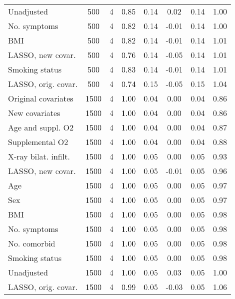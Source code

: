 \documentclass{article}
\begin{document}
\begin{table}[htbp]
{\begin{tabular}{lccccccc}
Unadjusted & 500 & 4 & 0.85 & 0.14 & 0.02 & 0.14 & 1.00\\
No. symptoms & 500 & 4 & 0.82 & 0.14 & -0.01 & 0.14 & 1.00\\
BMI & 500 & 4 & 0.82 & 0.14 & -0.01 & 0.14 & 1.01\\
LASSO, new covar. & 500 & 4 & 0.76 & 0.14 & -0.05 & 0.14 & 1.01\\
Smoking status & 500 & 4 & 0.83 & 0.14 & -0.01 & 0.14 & 1.01\\
LASSO, orig. covar. & 500 & 4 & 0.74 & 0.15 & -0.05 & 0.15 & 1.04\\ \midrule
Original covariates & 1500 & 4 & 1.00 & 0.04 & 0.00 & 0.04 & 0.86\\
New covariates & 1500 & 4 & 1.00 & 0.04 & 0.00 & 0.04 & 0.86\\
Age and suppl. O2 & 1500 & 4 & 1.00 & 0.04 & 0.00 & 0.04 & 0.87\\
Supplemental O2 & 1500 & 4 & 1.00 & 0.04 & 0.00 & 0.04 & 0.88\\
X-ray bilat. infilt. & 1500 & 4 & 1.00 & 0.05 & 0.00 & 0.05 & 0.93\\
LASSO, new covar. & 1500 & 4 & 1.00 & 0.05 & -0.01 & 0.05 & 0.96\\
Age & 1500 & 4 & 1.00 & 0.05 & 0.00 & 0.05 & 0.97\\
Sex & 1500 & 4 & 1.00 & 0.05 & 0.00 & 0.05 & 0.97\\
BMI & 1500 & 4 & 1.00 & 0.05 & 0.00 & 0.05 & 0.98\\
No. symptoms & 1500 & 4 & 1.00 & 0.05 & 0.00 & 0.05 & 0.98\\
No. comorbid & 1500 & 4 & 1.00 & 0.05 & 0.00 & 0.05 & 0.98\\
Smoking status & 1500 & 4 & 1.00 & 0.05 & 0.00 & 0.05 & 0.98\\
Unadjusted & 1500 & 4 & 1.00 & 0.05 & 0.03 & 0.05 & 1.00\\
LASSO, orig. covar. & 1500 & 4 & 0.99 & 0.05 & -0.03 & 0.05 & 1.06\\ \bottomrule
\hline
\end{tabular}}
\end{table}
\end{document}

